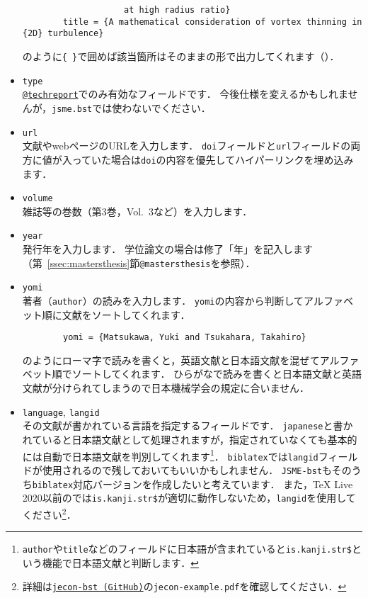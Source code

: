 \documentclass[a4paper,fleqn,uplatex,dvipdfmx]{jsarticle}
\makeatletter
\newcommand{\jsmefile}{\texttt{jsme.bst}}
\newcommand{\JSMErepos}{\texttt{JSME-bst}}
\newcommand{\ttmastersthesis}{\texttt{@mastersthesis}}
\newcommand{\tttechreport}{\texttt{@techreport}}
\makeatother
\begin{document}
\begin{itemize}
\begin{verbatim}
                    at high radius ratio}
        title = {A mathematical consideration of vortex thinning in {2D} turbulence}
        \end{verbatim}
        のように\verb|{ }|で囲めば該当箇所はそのままの形で出力してくれます（\citealp{Matsukawa:PoF2022,Yoneda:arXiv2016}）．
    \item \verb|type| \\
        \hyperref[ssec:techreport]{\tttechreport}でのみ有効なフィールドです．
        今後仕様を変えるかもしれませんが，\jsmefile では使わないでください．
    \item \verb|url| \\
        文献やwebページのURLを入力します．
        \verb|doi|フィールドと\verb|url|フィールドの両方に値が入っていた場合は\verb|doi|の内容を優先してハイパーリンクを埋め込みます．
    \item \verb|volume| \\
        雑誌等の巻数（第3巻，Vol.~3など）を入力します．
    \item \verb|year| \\
        発行年を入力します．
        学位論文の場合は修了「年」を記入します（第~\ref{ssec:mastersthesis}節\ttmastersthesis を参照）．
    \item \verb|yomi| \\
        著者（\verb|author|）の読みを入力します．
        \verb|yomi|の内容から判断してアルファベット順に文献をソートしてくれます．
        \begin{verbatim}
        yomi = {Matsukawa, Yuki and Tsukahara, Takahiro}
        \end{verbatim}
        のようにローマ字で読みを書くと，英語文献と日本語文献を混ぜてアルファベット順でソートしてくれます．
        ひらがなで読みを書くと日本語文献と英語文献が分けられてしまうので日本機械学会の規定に合いません．
    \item \verb|language|, \verb|langid| \\
        その文献が書かれている言語を指定するフィールドです．
        \verb|japanese|と書かれていると日本語文献として処理されますが，指定されていなくても基本的には自動で日本語文献を判別してくれます\footnote{\texttt{author}や\texttt{title}などのフィールドに日本語が含まれていると\texttt{is.kanji.str\$}という機能で日本語文献と判断します．}．
        \verb|biblatex|では\verb|langid|フィールドが使用されるので残しておいてもいいかもしれません．
        \JSMErepos もそのうち\verb|biblatex|対応バージョンを作成したいと考えています．
        また，TeX Live 2020以前の\upBibTeX{}では\verb|is.kanji.str$|が適切に動作しないため，\verb|langid|を使用してください\footnote{詳細は\href{https://github.com/ShiroTakeda/jecon-bst}{\texttt{jecon-bst (GitHub)}}の\texttt{jecon-example.pdf}を確認してください．}．
\end{itemize}
\end{document}
